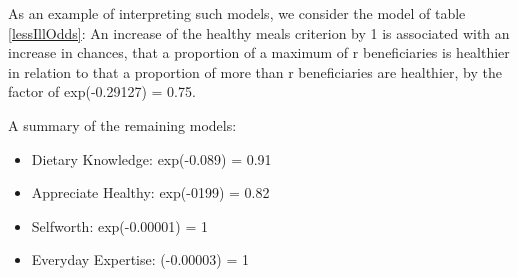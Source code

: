 \documentclass[12pt, a4paper, titlepage]{article}\usepackage[]{graphicx}\usepackage[]{color}
\begin{document}
As an example of interpreting such models, we consider the model of table \ref{lessIllOdds}: An increase of the healthy meals criterion by 1 is associated with an increase in chances, that a proportion of a maximum of r beneficiaries is healthier in relation to that a proportion of more than r beneficiaries are healthier, by the factor of exp(-0.29127) = 0.75.

A summary of the remaining models:

\begin{itemize}
  \item{Dietary Knowledge: exp(-0.089) = 0.91}
  \item{Appreciate Healthy: exp(-0199) = 0.82}
  \item{Selfworth: exp(-0.00001) = 1}
  \item{Everyday Expertise: (-0.00003) = 1} 
\end{itemize}
\end{document}
